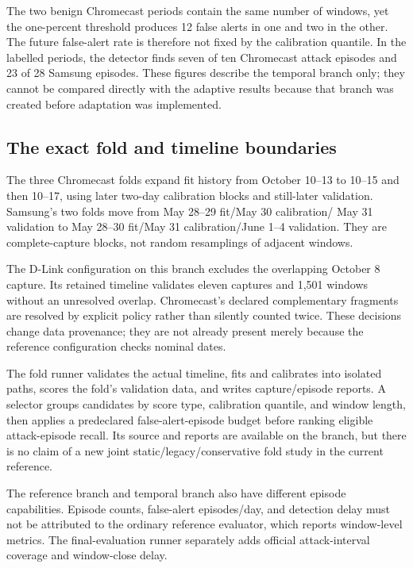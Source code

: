 The two benign Chromecast periods contain the same number of windows, yet the
one-percent threshold produces 12 false alerts in one and two in the other. The
future false-alert rate is therefore not fixed by the calibration quantile. In
the labelled periods, the detector finds seven of ten Chromecast attack episodes
and 23 of 28 Samsung episodes. These figures describe the temporal branch only;
they cannot be compared directly with the adaptive results because that branch
was created before adaptation was implemented.

\subsection{The exact fold and timeline boundaries}

The three Chromecast folds expand fit history from October 10--13 to 10--15
and then 10--17, using later two-day calibration blocks and still-later
validation. Samsung's two folds move from May 28--29 fit/May 30 calibration/
May 31 validation to May 28--30 fit/May 31 calibration/June 1--4 validation.
They are complete-capture blocks, not random resamplings of adjacent windows.

The D-Link configuration on this branch excludes the overlapping October 8
capture. Its retained timeline validates eleven captures and 1,501 windows
without an unresolved overlap. Chromecast's declared complementary fragments
are resolved by explicit policy rather than silently counted twice.
These decisions change data provenance; they are not already present merely
because the reference configuration checks nominal dates.

The fold runner validates the actual timeline, fits and calibrates into
isolated paths, scores the fold's validation data, and writes capture/episode
reports. A selector groups candidates by score type, calibration quantile,
and window length, then applies a predeclared false-alert-episode budget before
ranking eligible attack-episode recall. Its source and reports are available
on the branch, but there is no claim of a new joint static/legacy/conservative
fold study in the current reference.

The reference branch and temporal branch also have different episode
capabilities. Episode counts, false-alert episodes/day, and detection delay
must not be attributed to the ordinary reference evaluator, which reports
window-level metrics. The final-evaluation runner separately adds official
attack-interval coverage and window-close delay.
